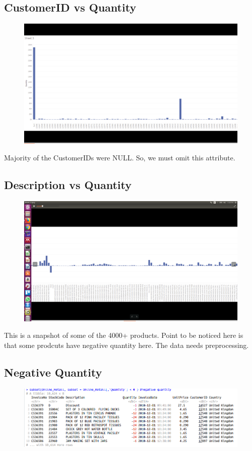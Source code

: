 \documentclass{article}
\begin{document}
\subsection{CustomerID vs Quantity } 
\begin{figure}[H]
	\includegraphics[width=13.5cm]{da/customerID.png} 
	\end{figure} 

Majority of the CustomerIDs were NULL. So, we must omit this attribute. 

\subsection{Description vs Quantity} 
\begin{figure}[H]
	\hspace{-3.0cm}
	\includegraphics[width=18.5cm]{da/description.png} 	 
	\end{figure} 

This is a snapshot of some of the 4000+ products. Point to be noticed here is that some prodcuts have negative quantity here. The data needs preprocessing. 

\subsection{Negative Quantity} 

\begin{figure}[H]
	\hspace{-3.0cm}
	\includegraphics[width=18.5cm]{da/negative_quantity.png} 
	\end{figure} 
\end{document}
